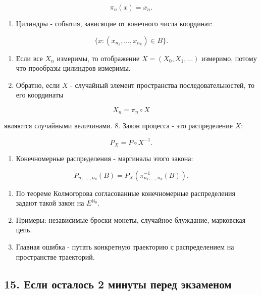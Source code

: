 \documentclass[
  11pt,
  a4paper,
]{article}
\providecommand{\tightlist}{%
  \setlength{\itemsep}{0pt}\setlength{\parskip}{0pt}}
\begin{document}
\[
\pi_n(x)=x_n.
\]

\begin{enumerate}
\def\labelenumi{\arabic{enumi}.}
\setcounter{enumi}{4}
\tightlist
\item
  Цилиндры - события, зависящие от конечного числа координат:
\end{enumerate}

\[
\{x:(x_{n_1},\ldots,x_{n_k})\in B\}.
\]

\begin{enumerate}
\def\labelenumi{\arabic{enumi}.}
\setcounter{enumi}{5}
\tightlist
\item
  Если все \(X_n\) измеримы, то отображение \(X=(X_0,X_1,\ldots)\)
  измеримо, потому что прообразы цилиндров измеримы.
\item
  Обратно, если \(X\) - случайный элемент пространства
  последовательностей, то его координаты
\end{enumerate}

\[
X_n=\pi_n\circ X
\]

являются случайными величинами. 8. Закон процесса - это распределение
\(X\):

\[
P_X=P\circ X^{-1}.
\]

\begin{enumerate}
\def\labelenumi{\arabic{enumi}.}
\setcounter{enumi}{8}
\tightlist
\item
  Конечномерные распределения - маргиналы этого закона:
\end{enumerate}

\[
P_{n_1,\ldots,n_k}(B)
=
P_X(\pi_{n_1,\ldots,n_k}^{-1}(B)).
\]

\begin{enumerate}
\def\labelenumi{\arabic{enumi}.}
\setcounter{enumi}{9}
\tightlist
\item
  По теореме Колмогорова согласованные конечномерные распределения
  задают такой закон на \(E^{\mathbb N_0}\).
\item
  Примеры: независимые броски монеты, случайное блуждание, марковская
  цепь.
\item
  Главная ошибка - путать конкретную траекторию с распределением на
  пространстве траекторий.
\end{enumerate}

\subsection{15. Если осталось 2 минуты перед
экзаменом}\label{ux435ux441ux43bux438-ux43eux441ux442ux430ux43bux43eux441ux44c-2-ux43cux438ux43dux443ux442ux44b-ux43fux435ux440ux435ux434-ux44dux43aux437ux430ux43cux435ux43dux43eux43c}
\end{document}
